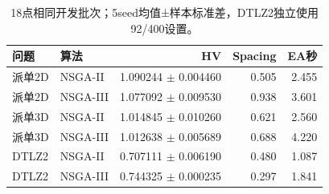 \begin{table}[htbp]\centering\small
\caption{18点相同开发批次；5seed均值±样本标准差，DTLZ2独立使用92/400设置。}\label{tab:evobaseline}
\begin{tabularx}{\linewidth}{Ylrrr}\toprule
问题 & 算法 & HV & Spacing & EA秒\\\midrule
派单2D & NSGA-II & 1.090244 $\pm$ 0.004460 & 0.505 & 2.455\\
派单2D & NSGA-III & 1.077092 $\pm$ 0.009530 & 0.938 & 3.601\\
派单3D & NSGA-II & 1.014845 $\pm$ 0.010260 & 0.621 & 2.560\\
派单3D & NSGA-III & 1.012638 $\pm$ 0.005689 & 0.688 & 4.220\\
DTLZ2 & NSGA-II & 0.707111 $\pm$ 0.006190 & 0.480 & 1.087\\
DTLZ2 & NSGA-III & 0.744325 $\pm$ 0.000235 & 0.297 & 1.841\\
\bottomrule\end{tabularx}
\end{table}
